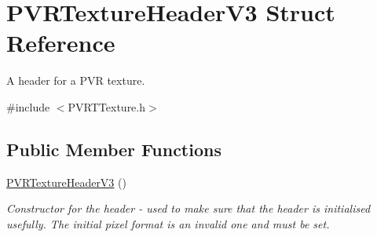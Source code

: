 \hypertarget{struct_p_v_r_texture_header_v3}{\section{P\+V\+R\+Texture\+Header\+V3 Struct Reference}
\label{struct_p_v_r_texture_header_v3}
}


A header for a P\+V\+R texture.  




{\ttfamily \#include $<$P\+V\+R\+T\+Texture.\+h$>$}

\subsection*{Public Member Functions}
\begin{DoxyCompactItemize}
\item 
\hyperlink{struct_p_v_r_texture_header_v3_aa7e17cf45a15ae57b5b3659eb87793a5}{P\+V\+R\+Texture\+Header\+V3} ()
\begin{DoxyCompactList}\small\item\em Constructor for the header -\/ used to make sure that the header is initialised usefully. The initial pixel format is an invalid one and must be set. \end{DoxyCompactList}\end{DoxyCompactItemize}
